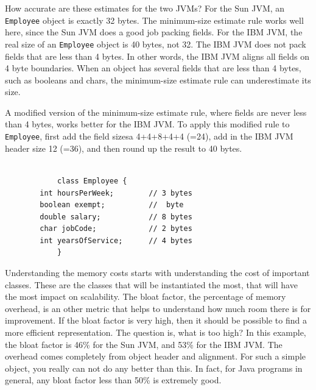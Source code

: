 How accurate are these estimates for the two JVMs?  For the Sun JVM, an \texttt{Employee} object is exactly 32 bytes. The minimum-size estimate rule works well here, since the Sun JVM does a good job packing fields. For the IBM JVM, the real size of an \texttt{Employee} object is 40 bytes, not 32. The IBM JVM does not pack fields that are less than 4 bytes. In other words, the IBM JVM aligns all fields on 4 byte boundaries. When an object has several fields that are less than 4 bytes, such as booleans and chars, the minimum-size estimate rule can underestimate its size. 

A modified version of the minimum-size estimate rule, where fields are never less than 4 bytes, works better for the IBM JVM. To apply this modified rule to \texttt{Employee}, first add the field sizesa 4+4+8+4+4 (=24), add in the IBM JVM header size 12 (=36), and then round up the result to 40 bytes.
\ttfamily
\begin{verbatim} 

			class Employee {
        int hoursPerWeek;        // 3 bytes
        boolean exempt;          //  byte
        double salary;           // 8 bytes
        char jobCode;            // 2 bytes
        int yearsOfService;      // 4 bytes
			}
\end{verbatim}
\normalfont


Understanding the memory costs starts with understanding the cost of important classes.  These are the classes that will be instantiated the most, that will have the most impact on scalability. The bloat factor, the percentage of memory overhead, is an other metric that helps to understand how much room there is for improvement. If the bloat factor is very high, then it should be possible to find a more efficient representation. The question is, what is too high?  
In this example, the bloat factor is 46\% for the Sun JVM, and 53\% for the IBM JVM. The overhead comes completely from object header and alignment. For such a simple object, you really can not do any better than this. In fact, for Java programs in general, any  bloat factor less than 50\% is extremely good.


